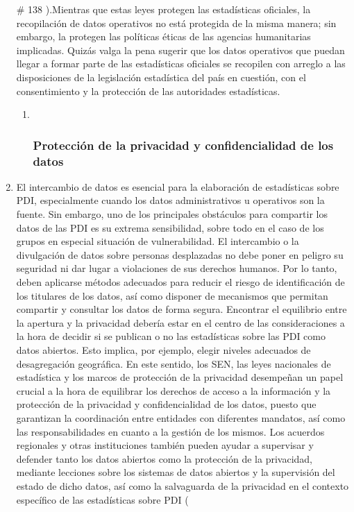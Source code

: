 \documentclass[
]{book}
\begin{document}
\begin{enumerate}
  \# 138
  ).Mientras que estas leyes protegen las estadísticas oficiales, la recopilación de datos operativos no está protegida de la misma manera; sin embargo, la protegen las políticas éticas de las agencias humanitarias implicadas. Quizás valga la pena sugerir que los datos operativos que puedan llegar a formar parte de las estadísticas oficiales se recopilen con arreglo a las disposiciones de la legislación estadística del país en cuestión, con el consentimiento y la protección de las autoridades estadísticas.

  \begin{enumerate}
  \def\labelenumii{\arabic{enumii}.}
  \item ~
    \hypertarget{protecciuxf3n-de-la-privacidad-y-confidencialidad-de-los-datos}{%
    \subsubsection{Protección de la privacidad y confidencialidad de los datos}\label{protecciuxf3n-de-la-privacidad-y-confidencialidad-de-los-datos}}
  \end{enumerate}
\item
  El intercambio de datos es esencial para la elaboración de estadísticas sobre PDI, especialmente cuando los datos administrativos u operativos son la fuente. Sin embargo, uno de los principales obstáculos para compartir los datos de las PDI es su extrema sensibilidad, sobre todo en el caso de los grupos en especial situación de vulnerabilidad. El intercambio o la divulgación de datos sobre personas desplazadas no debe poner en peligro su seguridad ni dar lugar a violaciones de sus derechos humanos. Por lo tanto, deben aplicarse métodos adecuados para reducir el riesgo de identificación de los titulares de los datos, así como disponer de mecanismos que permitan compartir y consultar los datos de forma segura. Encontrar el equilibrio entre la apertura y la privacidad debería estar en el centro de las consideraciones a la hora de decidir si se publican o no las estadísticas sobre las PDI como datos abiertos. Esto implica, por ejemplo, elegir niveles adecuados de desagregación geográfica. En este sentido, los SEN, las leyes nacionales de estadística y los marcos de protección de la privacidad desempeñan un papel crucial a la hora de equilibrar los derechos de acceso a la información y la protección de la privacidad y confidencialidad de los datos, puesto que garantizan la coordinación entre entidades con diferentes mandatos, así como las responsabilidades en cuanto a la gestión de los mismos. Los acuerdos regionales y otras instituciones también pueden ayudar a supervisar y defender tanto los datos abiertos como la protección de la privacidad, mediante lecciones sobre los sistemas de datos abiertos y la supervisión del estado de dicho datos, así como la salvaguarda de la privacidad en el contexto específico de las estadísticas sobre PDI (

\end{enumerate}
\end{document}
